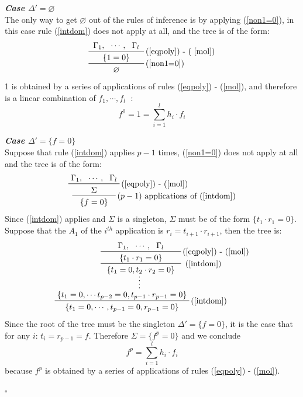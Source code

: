 \documentclass[a4paper,12pt,oneside]{book}
\newcommand*{\QED}{\hfill\ensuremath{\square}}
\let\emptyset\varnothing
\begin{document}
\textbf{\emph{Case $\Delta '=\emptyset$}} \\
The only way to get $\emptyset$ out of the rules of inference is by applying (\ref{non1=0}), in this case rule (\ref{intdom}) does not apply at all, and the tree is of the form: 
$$
\prftree[r]{(\ref{non1=0})}
{ \prftree[r]{(\ref{eqpoly}) - ( \ref{mol})}
{ \Gamma_1, }{\cdots ,}{\Gamma_l}
{\hspace{5mm}\{1=0\}\hspace{5mm}	} 
}
{\emptyset }
$$
1 is obtained by a series of applications of rules (\ref{eqpoly}) - (\ref{mol}), and therefore is a linear  combination of $f_1,\cdots ,f_l\;$ : 
$$f^0=1 = \sum_{i=1}^l h_i \cdot f_i$$

\newpage

\textbf{\emph{Case $\Delta '=\{f=0\}$ }} \\
Suppose that rule (\ref{intdom}) applies $p-1$ times, (\ref{non1=0}) does not apply at all and the tree is of the form:
$$
\prftree[r]{$(p-1)$ applications of (\ref{intdom})}
{ \prftree[r]{(\ref{eqpoly}) - (\ref{mol})}
{ \Gamma_1, }{\cdots ,}{\Gamma_l}
{\hspace{7mm}\Sigma\hspace{7mm}	} 
}
{\{f=0\} }
$$
Since (\ref{intdom}) applies and $\Sigma$ is a singleton, $\Sigma$ must be of the form $ \{ t_1 \cdot r_1 =0 \}$. Suppose that the $A_1$ of the $i^{th}$ application is $r_i=t_{i+1}\cdot r_{i+1}$, then the tree is:
$$
\prfsummary{
\prftree[r]{ (\ref{intdom})}
{ \prftree[r]{(\ref{eqpoly}) - (\ref{mol})}
{ \Gamma_1, }{\cdots ,}{\Gamma_l}
{\hspace{7mm}\{t_1 \cdot r_1=0\}\hspace{7mm}	} 
}
{\{ t_1=0, t_2 \cdot r_2=0\} }
}
{\prftree[r]{(\ref{intdom})}
{\{ t_1=0,\cdots t_{p-2}=0, t_{p-1}\cdot r_{p-1}=0\}  }
{\{ t_1=0,\cdots ,t_{p-1}=0,r_{p-1}=0\}}
}
$$
Since the root of the tree must be the singleton $\Delta '=\{f=0\}$, it is the case that for any $i$: $t_i=r_{p-1}=f $.
Therefore $\Sigma= \{ f^p =0 \}$ and we conclude 
$$f^p = \sum_{i=1}^l h_i \cdot f_i $$
because  $f^p$ is obtained by a series of applications of rules (\ref{eqpoly}) - (\ref{mol}).

\QED
\end{document}
